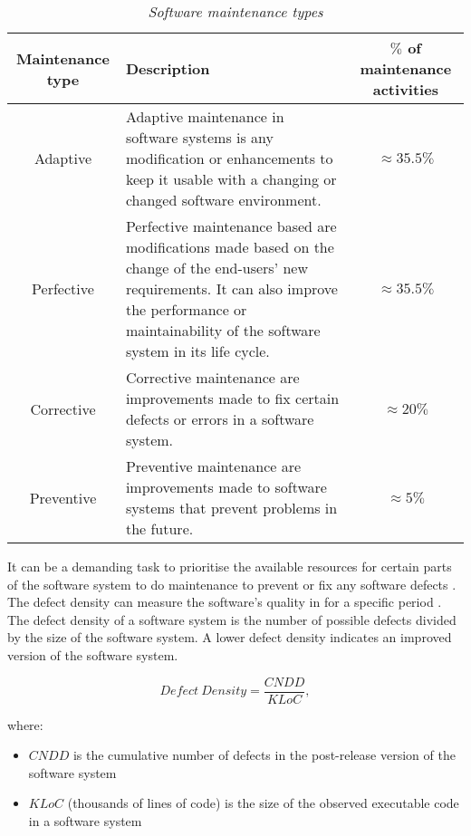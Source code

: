\begin{table}[!htb]
	\centering
	\caption[Software maintenance types]
	{\textit{Software maintenance types \cite{Ping2010,Hasan2012,Mamone1994}}}
	\label{tbl:ch1_maintenanceTypes}
	\begin{tabularx}{\textwidth}{|c|X|c|}
		\hline
		\textbf{Maintenance type} & \textbf{Description} & \textbf{$\%$ of maintenance activities} \\ \hline
		Adaptive & \raggedright Adaptive maintenance in software systems is any modification or enhancements to keep it usable with a changing or changed software environment. & $\approx 35.5\%$ \\ \hline
		Perfective & Perfective maintenance based are modifications made based on the change of the end-users' new requirements. It can also improve the performance or maintainability of the software system in its life cycle. & $\approx 35.5\%$ \\ \hline
		Corrective & \raggedright Corrective maintenance are improvements made to fix certain defects or errors in a software system. & $\approx 20\%$ \\ \hline
		Preventive & \raggedright  Preventive maintenance are improvements made to software systems that prevent problems in the future. & $\approx 5\%$ \\ \hline
	\end{tabularx}
\end{table}

It can be a demanding task to prioritise the available resources for certain parts of the software system to do maintenance to prevent or fix any software defects \cite{Mamone1994, Hasan2012}. The defect density can measure the software's quality in  for a specific period \cite{Shah2012, Alenezi2016}. The defect density of a software system is the number of possible defects divided by the size of the software system.  A lower defect density indicates an improved version of the software system.

\begin{equation}
	\label{eq:ch1_defectDensity}
	Defect~Density = \frac{CNDD}{KLoC},
\end{equation}

where:

\begin{itemize}
	\item $CNDD$ is the cumulative number of defects in the post-release version of the software system
	\item $KLoC$ (thousands of lines of code) is the size of the observed executable code in a software system 
\end{itemize}

